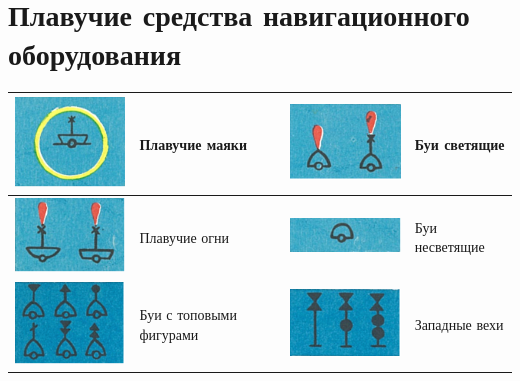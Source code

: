 \documentclass[a4paper, 12pt, twoside, final, book, russian, fittopage, cyremdash]{ncc}
\begin{document}
\section{Плавучие средства навигационного оборудования}%

\small
\begin{longtable}{M|m{0.2\textwidth}|M|m{0.2\textwidth}}
  \toprule
  \includegraphics[scale=1.3]{APP-2-C-1} & Плавучие маяки &
  \includegraphics[scale=1.3]{APP-2-C-2} & Буи светящие \\
  \midrule
  \includegraphics[scale=1.3]{APP-2-C-3} & Плавучие огни &
  \includegraphics[scale=1.3]{APP-2-C-4} & Буи несветящие \\
  \midrule
  \includegraphics[scale=1.3]{APP-2-C-5} & Буи с топовыми фигурами &
  \includegraphics[scale=1.3]{APP-2-C-6} & Западные вехи \\
\end{longtable}
\end{document}
